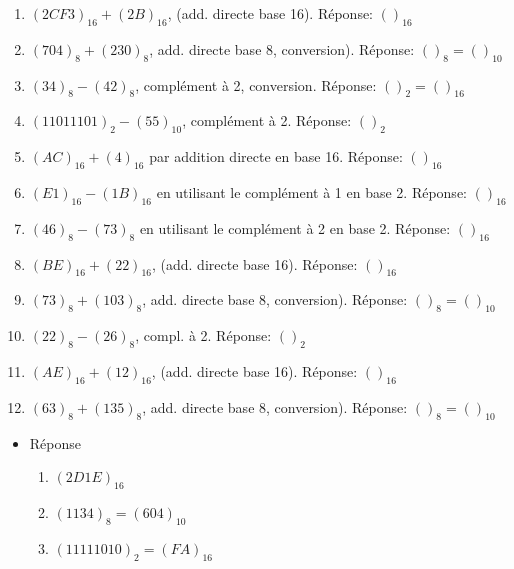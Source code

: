 \documentclass[letter, oneside]{book}
\begin{document}
\begin{itemize}
\begin{enumerate}
\item \((2CF3)_{16} + (2B)_{16}\), (add. directe base 16). Réponse: \(( )_{16}\)

\item \((704)_{8} + (230)_{8}\), add. directe base 8, conversion). Réponse: \(( )_{8} = ( )_{10}\)

\item \((34)_{8} - (42)_{8}\), complément à 2, conversion. Réponse: \(( )_{2} = ( )_{16}\)

\item \((11011101)_{2} - (55)_{10}\), complément à 2. Réponse: \(( )_{2}\)

\item \((AC)_{16} + (4)_{16}\) par addition directe en base 16. Réponse: \(( )_{16}\)

\item \((E1)_{16} - (1B)_{16}\) en utilisant le complément à 1 en base 2. Réponse: \(( )_{16}\)

\item \((46)_{8} - (73)_{8}\) en utilisant le complément à 2 en base 2. Réponse: \(( )_{16}\)

\item \((BE)_{16} + (22)_{16}\), (add. directe base 16). Réponse: \(( )_{16}\)

\item \((73)_{8} + (103)_{8}\), add. directe base 8, conversion). Réponse: \(( )_{8} = ( )_{10}\)

\item \((22)_{8} - (26)_{8}\), compl. à 2. Réponse: \(( )_{2}\)

\item \((AE)_{16} + (12)_{16}\), (add. directe base 16). Réponse: \(( )_{16}\)

\item \((63)_{8} + (135)_{8}\), add. directe base 8, conversion). Réponse: \(( )_{8} = ( )_{10}\)
\end{enumerate}

\begin{itemize}
\item Réponse
\label{sec:org4e9deac}
\begin{enumerate}
\item \((2D1E)_{16}\)

\item \((1134)_8 = (604)_{10}\)

\item \((1111 1010)_2 = (FA)_{16}\)


\end{enumerate}
\end{itemize}
\end{itemize}
\end{document}
